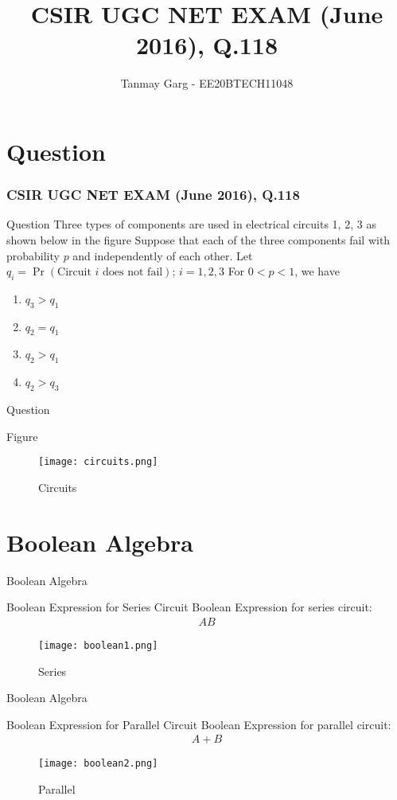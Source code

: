 \documentclass{beamer}
\title{CSIR UGC NET EXAM (June 2016), Q.118}
\author{Tanmay Garg - EE20BTECH11048}
\providecommand{\pr}[1]{\ensuremath{\Pr\left(#1\right)}}
\begin{document}
\begin{frame}
\titlepage
\end{frame}
\section{Question}
\begin{frame}
\frametitle{CSIR UGC NET EXAM (June 2016), Q.118}
\begin{block}{Question}
Three types of components are used in electrical circuits 1, 2, 3 as shown below in the figure
Suppose that each of the three components fail with probability $p$ and independently of each other. Let $q_i = \pr{\text{Circuit $i$ does not fail}}$; $i=1,2,3$ For $0<p<1$, we have
    \begin{enumerate}
        \item $q_3>q_1$
        \item $q_2=q_1$
        \item $q_2>q_1$
        \item $q_2>q_3$
    \end{enumerate}
\end{block}
\end{frame}
\begin{frame}{Question}
\begin{block}{Figure}
\begin{figure}[h]
    \centering
    \texttt{[image: circuits.png]}
    \caption{Circuits}
    \label{fig:fig_label}
\end{figure}
\end{block}

\end{frame}
\section{Boolean Algebra}
\begin{frame}{Boolean Algebra}
\begin{block}{Boolean Expression for Series Circuit}
     Boolean Expression for series circuit:
     \begin{align}
         AB
     \end{align}
     \begin{figure}
        \centering
        \texttt{[image: boolean1.png]}
        \caption{Series}
        \label{boolean1}
    \end{figure}
\end{block}
    
\end{frame}
\begin{frame}{Boolean Algebra}
\begin{block}{Boolean Expression for Parallel Circuit}
     Boolean Expression for parallel circuit:
     \begin{align}
         A+B
     \end{align}
     \begin{figure}
        \centering
        \texttt{[image: boolean2.png]}
        \caption{Parallel}
        \label{boolean2}
    \end{figure}
\end{block}
    
\end{frame}
\end{document}
